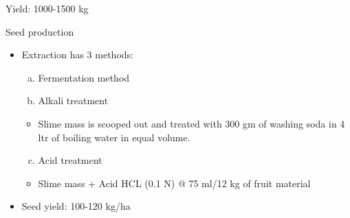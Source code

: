 \documentclass[
  ignorenonframetext,
  aspectratio=169]{beamer}
\providecommand{\tightlist}{%
  \setlength{\itemsep}{0pt}\setlength{\parskip}{0pt}}
\begin{document}
\begin{frame}{}
\protect\hypertarget{section-5}{}
Yield: 1000-1500 kg
\end{frame}

\begin{frame}{Seed production}
\protect\hypertarget{seed-production}{}
\begin{itemize}
\tightlist
\item
  Extraction has 3 methods:

  \begin{enumerate}
  [a.]
  \tightlist
  \item
    Fermentation method
  \item
    Alkali treatment
  \end{enumerate}

  \begin{itemize}
  \tightlist
  \item
    Slime mass is scooped out and treated with 300 gm of washing soda in
    4 ltr of boiling water in equal volume.
  \end{itemize}

  \begin{enumerate}
  [a.]
  \setcounter{enumi}{2}
  \tightlist
  \item
    Acid treatment
  \end{enumerate}

  \begin{itemize}
  \tightlist
  \item
    Slime mass + Acid HCL (0.1 N) @ 75 ml/12 kg of fruit material
  \end{itemize}
\item
  Seed yield: 100-120 kg/ha
\end{itemize}
\end{frame}
\end{document}

